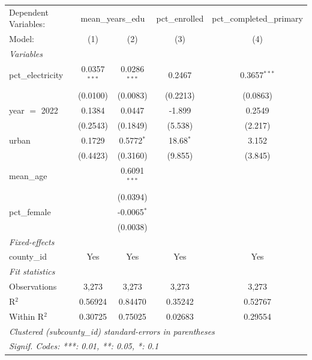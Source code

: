 
\begingroup
\centering
\begin{tabular}{lcccc}
   \tabularnewline \midrule \midrule
   Dependent Variables: & \multicolumn{2}{c}{mean\_years\_edu} & pct\_enrolled & pct\_completed\_primary\\
   Model:            & (1)            & (2)            & (3)         & (4)\\  
   \midrule
   \emph{Variables}\\
   pct\_electricity  & 0.0357$^{***}$ & 0.0286$^{***}$ & 0.2467      & 0.3657$^{***}$\\   
                     & (0.0100)       & (0.0083)       & (0.2213)    & (0.0863)\\   
   year $=$ 2022     & 0.1384         & 0.0447         & -1.899      & 0.2549\\   
                     & (0.2543)       & (0.1849)       & (5.538)     & (2.217)\\   
   urban             & 0.1729         & 0.5772$^{*}$   & 18.68$^{*}$ & 3.152\\   
                     & (0.4423)       & (0.3160)       & (9.855)     & (3.845)\\   
   mean\_age         &                & 0.6091$^{***}$ &             &   \\   
                     &                & (0.0394)       &             &   \\   
   pct\_female       &                & -0.0065$^{*}$  &             &   \\   
                     &                & (0.0038)       &             &   \\   
   \midrule
   \emph{Fixed-effects}\\
   county\_id        & Yes            & Yes            & Yes         & Yes\\  
   \midrule
   \emph{Fit statistics}\\
   Observations      & 3,273          & 3,273          & 3,273       & 3,273\\  
   R$^2$             & 0.56924        & 0.84470        & 0.35242     & 0.52767\\  
   Within R$^2$      & 0.30725        & 0.75025        & 0.02683     & 0.29554\\  
   \midrule \midrule
   \multicolumn{5}{l}{\emph{Clustered (subcounty\_id) standard-errors in parentheses}}\\
   \multicolumn{5}{l}{\emph{Signif. Codes: ***: 0.01, **: 0.05, *: 0.1}}\\
\end{tabular}
\par\endgroup



